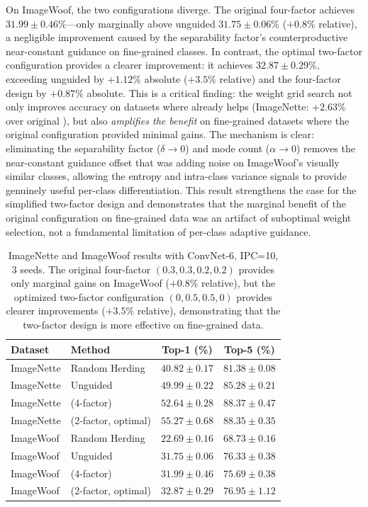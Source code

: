 On ImageWoof, the two configurations diverge. The original four-factor \cags{} achieves $31.99 \pm 0.46\%$---only marginally above unguided $31.75 \pm 0.06\%$ ($+0.8\%$ relative), a negligible improvement caused by the separability factor's counterproductive near-constant guidance on fine-grained classes. In contrast, the optimal two-factor configuration provides a clearer improvement: it achieves $32.87 \pm 0.29\%$, exceeding unguided by $+1.12\%$ absolute ($+3.5\%$ relative) and the four-factor design by $+0.87\%$ absolute. This is a critical finding: the weight grid search not only improves accuracy on datasets where \cags{} already helps (ImageNette: $+2.63\%$ over original \cags{}), but also \emph{amplifies the benefit} on fine-grained datasets where the original configuration provided minimal gains. The mechanism is clear: eliminating the separability factor ($\delta \to 0$) and mode count ($\alpha \to 0$) removes the near-constant guidance offset that was adding noise on ImageWoof's visually similar classes, allowing the entropy and intra-class variance signals to provide genuinely useful per-class differentiation. This result strengthens the case for the simplified two-factor design and demonstrates that the marginal benefit of the original configuration on fine-grained data was an artifact of suboptimal weight selection, not a fundamental limitation of per-class adaptive guidance.

\begin{table}[t]
\centering
\caption{ImageNette and ImageWoof results with ConvNet-6, IPC=10, 3 seeds. The original four-factor \cags{} $(0.3, 0.3, 0.2, 0.2)$ provides only marginal gains on ImageWoof ($+0.8\%$ relative), but the optimized two-factor configuration $(0, 0.5, 0.5, 0)$ provides clearer improvements ($+3.5\%$ relative), demonstrating that the two-factor design is more effective on fine-grained data.}
\label{tab:results-nette-woof}
\begin{tabular}{llcc}
\toprule
\textbf{Dataset} & \textbf{Method} & \textbf{Top-1 (\%)} & \textbf{Top-5 (\%)} \\
\midrule
ImageNette & Random Herding & $40.82 \pm 0.17$ & $81.38 \pm 0.08$ \\
ImageNette & Unguided & $49.99 \pm 0.22$ & $85.28 \pm 0.21$ \\
ImageNette & \cags{} (4-factor) & $52.64 \pm 0.28$ & $88.37 \pm 0.47$ \\
ImageNette & \cags{} (2-factor, optimal) & $\mathbf{55.27 \pm 0.68}$ & $\mathbf{88.35 \pm 0.35}$ \\
\midrule
ImageWoof & Random Herding & $22.69 \pm 0.16$ & $68.73 \pm 0.16$ \\
ImageWoof & Unguided & $31.75 \pm 0.06$ & $76.33 \pm 0.38$ \\
ImageWoof & \cags{} (4-factor) & $31.99 \pm 0.46$ & $75.69 \pm 0.38$ \\
ImageWoof & \cags{} (2-factor, optimal) & $\mathbf{32.87 \pm 0.29}$ & $\mathbf{76.95 \pm 1.12}$ \\
\bottomrule
\end{tabular}
\end{table}


